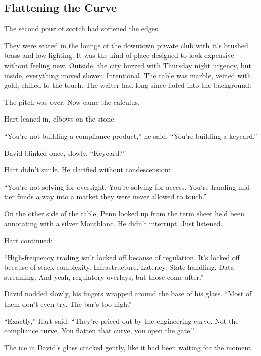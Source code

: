 \subsection{Flattening the Curve}


The second pour of scotch had softened the edges.

They were seated in the lounge of the downtown private club with it's brushed brass and low lighting. It was the kind 
of place designed to look expensive without feeling new. Outside, the city buzzed with Thursday night urgency, but inside, 
everything moved slower. Intentional. The table was marble, veined with gold, chilled to the touch. The waiter had 
long since faded into the background.

The pitch was over. Now came the calculus.

Hart leaned in, elbows on the stone.

``You’re not building a compliance product,'' he said. ``You’re building a keycard.''

David blinked once, slowly. ``Keycard?''

Hart didn’t smile. He clarified without condescension:

``You’re not solving for oversight. You’re solving for access. You’re handing mid-tier funds a way into a market they were 
never allowed to touch.''

On the other side of the table, Penn looked up from the term sheet he’d been annotating with a silver Montblanc. He didn’t 
interrupt. Just listened.

Hart continued:

``High-frequency trading isn’t locked off because of regulation. It’s locked off because of stack complexity. 
Infrastructure. Latency. State handling. Data streaming. And yeah, regulatory overlays, but those come after.''

David nodded slowly, his fingers wrapped around the base of his glass. ``Most of them don’t even try. The bar’s too high.''

``Exactly,'' Hart said. ``They’re priced out by the engineering curve. Not the compliance curve. You flatten that curve, you 
open the gate.''

The ice in David’s glass cracked gently, like it had been waiting for the moment.


\medskip

